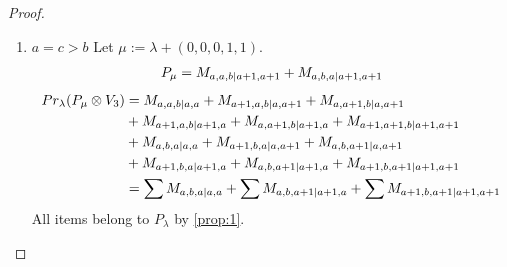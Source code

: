 \begin{proof}
\begin{enumerate}
    \item $a=c>b$
        Let $\mu:=\lambda + (0,0,0,1,1) $.
        \begin{equation}\notag
          \begin{aligned}
            P_\mu = M_{a,a,b|a+1,a+1}
+ M_{a,b,a|a+1,a+1}
          \end{aligned}
        \end{equation}
        \begin{equation}\notag
          \begin{aligned}
            Pr_{\lambda}(P_\mu \otimes V_{3}) &=
M_{a,a,b|a,a}
+ M_{a+1,a,b|a,a+1}
+ M_{a,a+1,b|a,a+1}\\
                                              &
+ M_{a+1,a,b|a+1,a}
+ M_{a,a+1,b|a+1,a}
+ M_{a+1,a+1,b|a+1,a+1}\\
                                              &
+ M_{a,b,a|a,a}
+ M_{a+1,b,a|a,a+1}
+ M_{a,b,a+1|a,a+1}\\
                                              &
+ M_{a+1,b,a|a+1,a}
+ M_{a,b,a+1|a+1,a}
+ M_{a+1,b,a+1|a+1,a+1} \\
                                               &=
\sum M_{a,b,a|a,a}
+ \sum M_{a,b,a+1|a+1,a}
+ \sum M_{a+1,b,a+1|a+1,a+1}
          \end{aligned}
        \end{equation}
All items belong to $P_\lambda$ by \cref{prop:1}.


\end{enumerate}
\end{proof}
